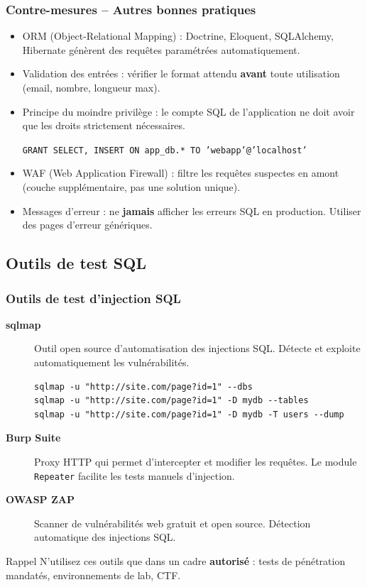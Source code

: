 \documentclass{beamer}
\def\emptyline{\vspace{10pt}}
\begin{document}
\begin{frame}
\frametitle{Contre-mesures -- Autres bonnes pratiques}

\begin{itemize}
\item \alert{ORM} (Object-Relational Mapping) : Doctrine, Eloquent, SQLAlchemy, Hibernate génèrent des requêtes paramétrées automatiquement.

\item \alert{Validation des entrées} : vérifier le format attendu \textbf{avant} toute utilisation (email, nombre, longueur max).

\item \alert{Principe du moindre privilège} : le compte SQL de l'application ne doit avoir que les droits strictement nécessaires.
\begin{center}
\texttt{GRANT SELECT, INSERT ON app\_db.* TO 'webapp'@'localhost'}
\end{center}

\item \alert{WAF} (Web Application Firewall) : filtre les requêtes suspectes en amont (couche supplémentaire, pas une solution unique).

\item \alert{Messages d'erreur} : ne \textbf{jamais} afficher les erreurs SQL en production. Utiliser des pages d'erreur génériques.
\end{itemize}
\end{frame}


\subsection{Outils de test SQL}

\begin{frame}[fragile]
\frametitle{Outils de test d'injection SQL}

\begin{description}
\item[\textbf{sqlmap}] Outil open source d'automatisation des injections SQL. Détecte et exploite automatiquement les vulnérabilités.
\begin{lstlisting}[basicstyle=\ttfamily\tiny,frame=single]
sqlmap -u "http://site.com/page?id=1" --dbs
sqlmap -u "http://site.com/page?id=1" -D mydb --tables
sqlmap -u "http://site.com/page?id=1" -D mydb -T users --dump
\end{lstlisting}

\item[\textbf{Burp Suite}] Proxy HTTP qui permet d'intercepter et modifier les requêtes. Le module \texttt{Repeater} facilite les tests manuels d'injection.

\item[\textbf{OWASP ZAP}] Scanner de vulnérabilités web gratuit et open source. Détection automatique des injections SQL.
\end{description}

\emptyline
\begin{alertblock}{Rappel}
N'utilisez ces outils que dans un cadre \textbf{autorisé} : tests de pénétration mandatés, environnements de lab, CTF.
\end{alertblock}
\end{frame}
\end{document}
